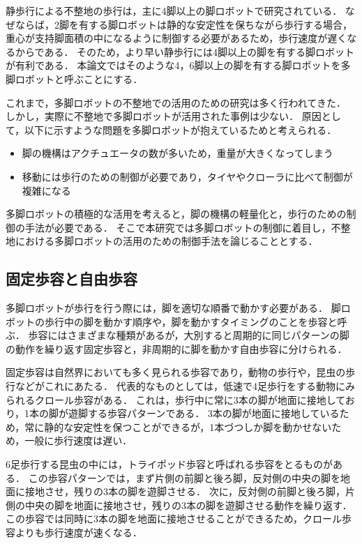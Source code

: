 静歩行による不整地の歩行は，主に4脚以上の脚ロボットで研究されている．
なぜならば，2脚を有する脚ロボットは静的な安定性を保ちながら歩行する場合，
重心が支持脚面積の中になるように制御する必要があるため，歩行速度が遅くなるからである．
そのため，より早い静歩行には4脚以上の脚を有する脚ロボットが有利である．
本論文ではそのような4，6脚以上の脚を有する脚ロボットを多脚ロボットと呼ぶことにする．

これまで，多脚ロボットの不整地での活用のための研究は多く行われてきた．
しかし，実際に不整地で多脚ロボットが活用された事例は少ない．
原因として，以下に示すような問題を多脚ロボットが抱えているためと考えられる\cite{Locomotion_for_difficult_terrain}．

\begin{itemize}
  \item 脚の機構はアクチュエータの数が多いため，重量が大きくなってしまう
  \item 移動には歩行のための制御が必要であり，タイヤやクローラに比べて制御が複雑になる
\end{itemize}

多脚ロボットの積極的な活用を考えると，脚の機構の軽量化と，歩行のための制御の手法が必要である．
そこで本研究では多脚ロボットの制御に着目し，不整地における多脚ロボットの活用のための制御手法を論じることとする．

\subsection{固定歩容と自由歩容}
多脚ロボットが歩行を行う際には，脚を適切な順番で動かす必要がある．
脚ロボットの歩行中の脚を動かす順序や，脚を動かすタイミングのことを歩容と呼ぶ．
歩容にはさまざまな種類があるが，大別すると周期的に同じパターンの脚の動作を繰り返す固定歩容と，非周期的に脚を動かす自由歩容に分けられる．

固定歩容は自然界においても多く見られる歩容であり，動物の歩行や，昆虫の歩行などがこれにあたる．
代表的なものとしては，低速で4足歩行をする動物にみられるクロール歩容がある．
これは，歩行中に常に3本の脚が地面に接地しており，1本の脚が遊脚する歩容パターンである．
3本の脚が地面に接地しているため，常に静的な安定性を保つことができるが，1本づつしか脚を動かせないため，一般に歩行速度は遅い．

6足歩行する昆虫の中には，トライポッド歩容と呼ばれる歩容をとるものがある．
この歩容パターンでは，まず片側の前脚と後ろ脚，反対側の中央の脚を地面に接地させ，残りの3本の脚を遊脚させる．
次に，反対側の前脚と後ろ脚，片側の中央の脚を地面に接地させ，残りの3本の脚を遊脚させる動作を繰り返す．
この歩容では同時に3本の脚を地面に接地させることができるため，クロール歩容よりも歩行速度が速くなる．

